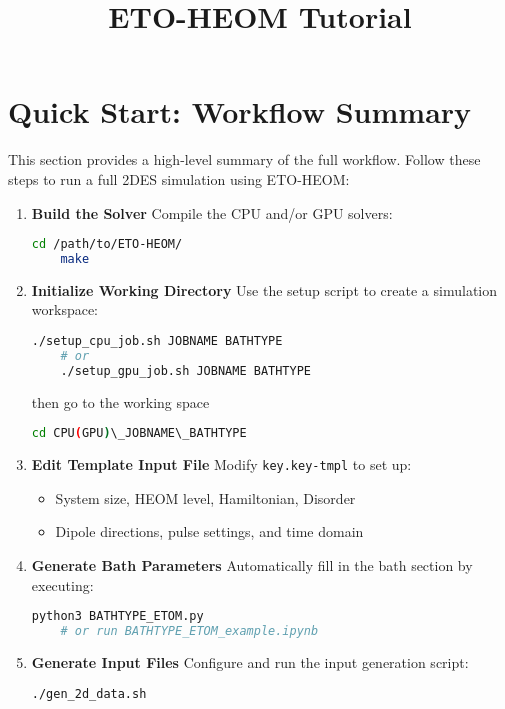 \documentclass{article}
\title{ETO-HEOM Tutorial}
\begin{document}
\maketitle

\section*{Quick Start: Workflow Summary}

This section provides a high-level summary of the full workflow. Follow these steps to run a full 2DES simulation using ETO-HEOM:

\begin{enumerate}
    \item \textbf{Build the Solver}  
    Compile the CPU and/or GPU solvers:
    \begin{lstlisting}[language=bash]
    cd /path/to/ETO-HEOM/
    make
    \end{lstlisting}

    \item \textbf{Initialize Working Directory}  
    Use the setup script to create a simulation workspace:
    \begin{lstlisting}[language=bash]
    ./setup_cpu_job.sh JOBNAME BATHTYPE
    # or
    ./setup_gpu_job.sh JOBNAME BATHTYPE
    \end{lstlisting}
    then go to the working space
    \begin{lstlisting}[language=bash]
    cd CPU(GPU)\_JOBNAME\_BATHTYPE
    \end{lstlisting}

    \item \textbf{Edit Template Input File}  
    Modify \texttt{key.key-tmpl} to set up:
    \begin{itemize}
        \item System size, HEOM level, Hamiltonian, Disorder
        \item Dipole directions, pulse settings, and time domain
    \end{itemize}

    \item \textbf{Generate Bath Parameters}  
    Automatically fill in the bath section by executing:
    \begin{lstlisting}[language=bash]
    python3 BATHTYPE_ETOM.py
    # or run BATHTYPE_ETOM_example.ipynb
    \end{lstlisting}

    \item \textbf{Generate Input Files}  
    Configure and run the input generation script:
    \begin{lstlisting}[language=bash]
    ./gen_2d_data.sh
    \end{lstlisting}


\end{enumerate}
\end{document}
